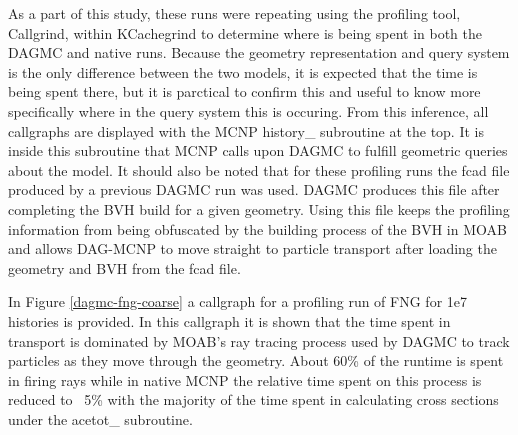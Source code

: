 \documentclass[12pt, a4paper]{article}
\begin{document}
As a part of this study, these runs were repeating using the profiling tool, Callgrind, within KCachegrind to determine where is being spent in both the DAGMC and native runs. Because the geometry representation and query system is the only difference between the two models, it is expected that the time is being spent there, but it is parctical to confirm this and useful to know more specifically where in the query system this is occuring. From this inference, all callgraphs are displayed with the MCNP history\_ subroutine at the top. It is inside this subroutine that MCNP calls upon DAGMC to fulfill geometric queries about the model. It should also be noted that for these profiling runs the fcad file produced by a previous DAGMC run was used. DAGMC produces this file after completing the BVH build for a given geometry. Using this file keeps the profiling information from being obfuscated by the building process of the BVH in MOAB and allows DAG-MCNP to move straight to particle transport after loading the geometry and BVH from the fcad file. 

In Figure \ref{dagmc-fng-coarse} a callgraph for a profiling run of FNG for 1e7 histories is provided. In this callgraph it is shown that the time spent in transport is dominated by MOAB's ray tracing process used by DAGMC to track particles as they move through the geometry. About 60\% of the runtime is spent in firing rays while in native MCNP the relative time spent on this process is reduced to ~5\% with the majority of the time spent in calculating cross sections under the acetot\_ subroutine. 
\end{document}
